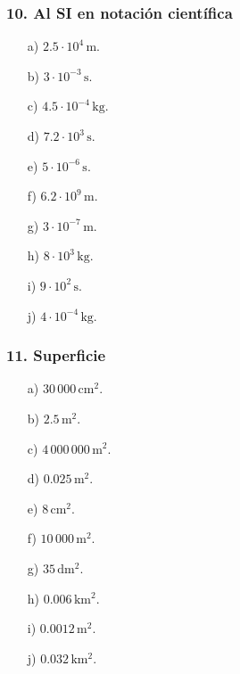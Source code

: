 \subsubsection*{10. Al SI en notación científica}
\begin{enumerate}
    \item[a)] $2.5\cdot10^4\,\mathrm{m}$.
    \item[b)] $3\cdot10^{-3}\,\mathrm{s}$.
    \item[c)] $4.5\cdot10^{-4}\,\mathrm{kg}$.
    \item[d)] $7.2\cdot10^3\,\mathrm{s}$.
    \item[e)] $5\cdot10^{-6}\,\mathrm{s}$.
    \item[f)] $6.2\cdot10^9\,\mathrm{m}$.
    \item[g)] $3\cdot10^{-7}\,\mathrm{m}$.
    \item[h)] $8\cdot10^3\,\mathrm{kg}$.
    \item[i)] $9\cdot10^2\,\mathrm{s}$.
    \item[j)] $4\cdot10^{-4}\,\mathrm{kg}$.
\end{enumerate}

\subsubsection*{11. Superficie}
\begin{enumerate}
    \item[a)] $30\,000\,\mathrm{cm^2}$.
    \item[b)] $2.5\,\mathrm{m^2}$.
    \item[c)] $4\,000\,000\,\mathrm{m^2}$.
    \item[d)] $0.025\,\mathrm{m^2}$.
    \item[e)] $8\,\mathrm{cm^2}$.
    \item[f)] $10\,000\,\mathrm{m^2}$.
    \item[g)] $35\,\mathrm{dm^2}$.
    \item[h)] $0.006\,\mathrm{km^2}$.
    \item[i)] $0.0012\,\mathrm{m^2}$.
    \item[j)] $0.032\,\mathrm{km^2}$.
\end{enumerate}

